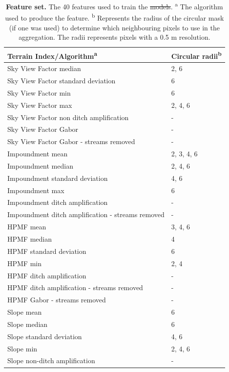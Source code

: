 \documentclass[11pt, review]{elsarticle} %
\providecommand{\DIFaddtex}[1]{{\protect\color{blue}\uwave{#1}}} %
\providecommand{\DIFdeltex}[1]{{\protect\color{red}\sout{#1}}}                      %
\providecommand{\DIFaddFL}[1]{\DIFadd{#1}} %
\providecommand{\DIFdelFL}[1]{\DIFdel{#1}} %
\providecommand{\DIFaddbeginFL}{} %
\providecommand{\DIFaddendFL}{} %
\providecommand{\DIFdelbeginFL}{} %
\providecommand{\DIFdelendFL}{} %
\providecommand{\DIFadd}[1]{\texorpdfstring{\DIFaddtex{#1}}{#1}} %
\providecommand{\DIFdel}[1]{\texorpdfstring{\DIFdeltex{#1}}{}} %
\begin{document}
\begin{table} [!htb]
\centering
    {\begin{tabular}{ll}
      \textbf{Terrain Index/Algorithm}\textsuperscript{a} & \textbf{Circular radii}\textsuperscript{b} \\ 
      \hline
      Sky View Factor median &2, 6 \\
      Sky View Factor standard deviation & 6 \\
      Sky View Factor min & 6 \\
      Sky View Factor max & 2, 4, 6 \\
      Sky View Factor non ditch amplification & - \\ 
      Sky View Factor Gabor & - \\
      Sky View Factor Gabor - streams removed & -\\

      Impoundment mean & 2, 3, 4, 6 \\
      Impoundment median & 2, 4, 6 \\
      Impoundment standard deviation & 4, 6 \\
      Impoundment max & 6 \\
      Impoundment ditch amplification & - \\
      Impoundment ditch amplification - streams removed & - \\

      HPMF mean & 3, 4, 6 \\
      HPMF median & 4 \\
      HPMF standard deviation & 6 \\
      HPMF min & 2, 4 \\
      HPMF ditch amplification & - \\
      HPMF ditch amplification - streams removed & - \\
      HPMF Gabor - streams removed & -\\

      Slope mean & 6 \\
      Slope median & 6 \\
      Slope standard deviation & 4, 6 \\
      Slope min & 2, 4, 6 \\
      Slope non-ditch amplification & - \\
      \hline
    \end{tabular}}
    \caption{\textbf{Feature set.} The 40 features used to train the \DIFdelbeginFL \DIFdelFL{models}\DIFdelendFL \DIFaddbeginFL \DIFaddFL{model}\DIFaddendFL .
    \newline \textsuperscript{a} The algorithm used to produce the feature. \newline
        \textsuperscript{b} Represents the radius of the circular mask (if one was used) to determine which neighbouring pixels to use in the aggregation. The radii represents pixels with a 0.5 m resolution.}
    \label{featuretable}
\end{table}
\end{document}
